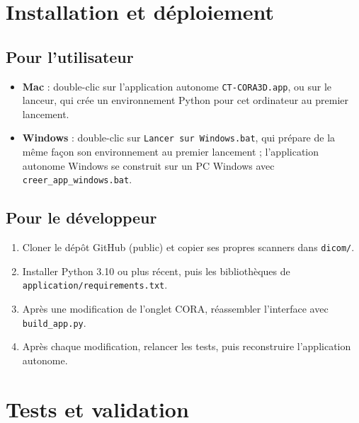 \documentclass[11pt,a4paper]{article}
\newcommand{\fichier}[1]{\texttt{\small #1}}
\newcommand{\reserver}[1]{\par\vskip 0pt plus #1\penalty-200\vskip 0pt plus -#1\relax}
\begin{document}
\reserver{7\baselineskip}
\section{Installation et déploiement}

\subsection{Pour l'utilisateur}
\begin{itemize}
  \item \textbf{Mac} : double-clic sur l'application autonome \fichier{CT-CORA3D.app}, ou sur le lanceur, qui crée un
        environnement Python pour cet ordinateur au premier lancement.
  \item \textbf{Windows} : double-clic sur \fichier{Lancer sur Windows.bat}, qui prépare de la même façon son
        environnement au premier lancement ; l'application autonome Windows se construit sur un PC Windows avec
        \fichier{creer\_app\_windows.bat}.
\end{itemize}

\subsection{Pour le développeur}
\begin{enumerate}
  \item Cloner le dépôt GitHub (public) et copier ses propres scanners dans \fichier{dicom/}.
  \item Installer Python 3.10 ou plus récent, puis les bibliothèques de \fichier{application/requirements.txt}.
  \item Après une modification de l'onglet CORA, réassembler l'interface avec \fichier{build\_app.py}.
  \item Après chaque modification, relancer les tests, puis reconstruire l'application autonome.
\end{enumerate}

\section{Tests et validation}
\end{document}
